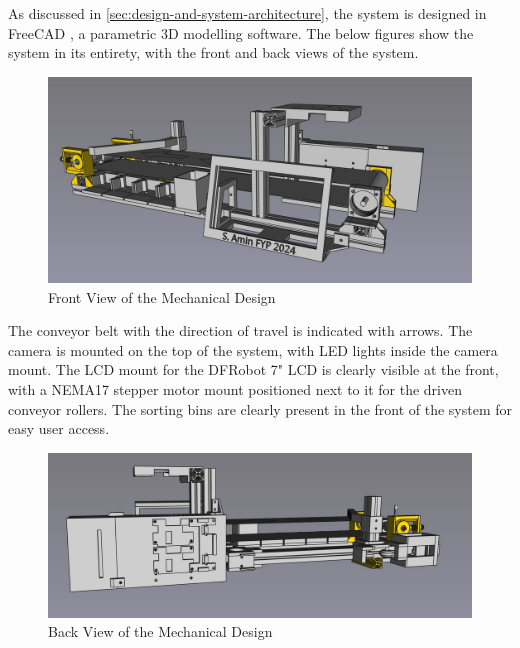 As discussed in \autoref{sec:design-and-system-architecture}, the system is designed in FreeCAD \cite{freecad}, a parametric 3D modelling software. The below figures show the system in its entirety, with the front and back views of the system.

\begin{figure}[H]
    \hfill
    \begin{minipage}[h]{0.95\textwidth}
        \centering
        \includegraphics[width=\textwidth]{imgs/freecad/wholefront.jpg}
        \caption{Front View of the Mechanical Design}
    \end{minipage}
    \hfill
\end{figure}

The conveyor belt with the direction of travel is indicated with arrows. The camera is mounted on the top of the system, with LED lights inside the camera mount. The LCD mount for the DFRobot 7" LCD is clearly visible at the front, with a NEMA17 stepper motor mount positioned next to it for the driven conveyor rollers. The sorting bins are clearly present in the front of the system for easy user access.

\begin{figure}[H]
    \hfill
    \begin{minipage}[h]{0.95\textwidth}
        \centering
        \includegraphics[width=\textwidth]{imgs/freecad/wholeback.jpg}
        \caption{Back View of the Mechanical Design}
    \end{minipage}
    \hfill
\end{figure}

